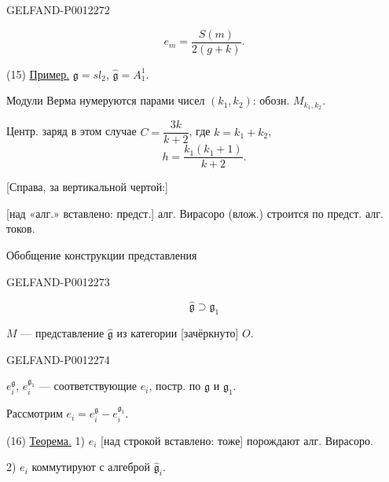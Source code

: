 \begin{GelfandAdjacentEvidence}{GELFAND-P001227}{2}

\begin{equation*}
e_m=\frac{S(m)}{2(g+k)}.\tag{14}
\end{equation*}

(15) \underline{Пример.} \(\mathfrak g=sl_2\), \(\widehat{\mathfrak g}=A_1^1\).

Модули Верма нумеруются парами чисел \((k_1,k_2)\): обозн. \(M_{k_1,k_2}\).

Центр. заряд в этом случае \(C=\dfrac{3k}{k+2}\), где \(k=k_1+k_2\),
\begin{equation*}
h=\frac{k_1(k_1+1)}{k+2}.
\end{equation*}

[Справа, за вертикальной чертой:]

[над «алг.» вставлено: предст.] алг. Вирасоро (влож.) строится по предст. алг. токов.

Обобщение конструкции представления

\end{GelfandAdjacentEvidence}
\begin{GelfandAdjacentEvidence}{GELFAND-P001227}{3}

\begin{equation*}
\widehat{\mathfrak g}\supset\widehat{\mathfrak g}_1
\end{equation*}

\(M\) --- представление \(\widehat{\mathfrak g}\) из категории [зачёркнуто] \(O\).
\end{GelfandAdjacentEvidence}
\begin{GelfandAdjacentEvidence}{GELFAND-P001227}{4}


\(e_i^{\mathfrak g}\), \(e_i^{\mathfrak g_1}\) --- соответствующие \(e_i\),
постр. по \(\mathfrak g\) и \(\mathfrak g_1\).

Рассмотрим \(e_i=e_i^{\mathfrak g}-e_i^{\mathfrak g_1}\).

(16) \underline{Теорема.} 1) \(e_i\) [над строкой вставлено: тоже] порождают алг. Вирасоро.

2) \(e_i\) коммутируют с алгеброй \(\widehat{\mathfrak g}_i\).
\end{GelfandAdjacentEvidence}
